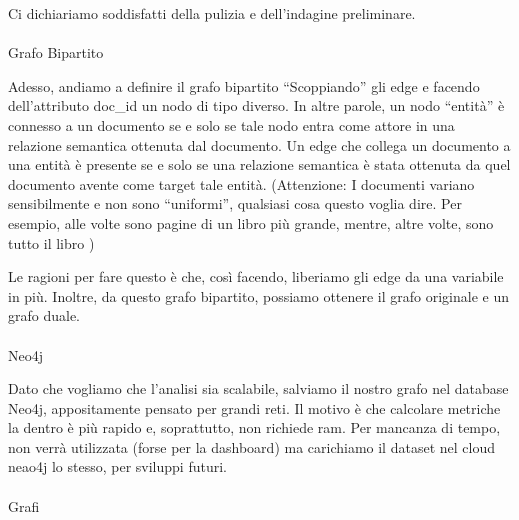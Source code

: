 \documentclass[
  italian,
  a4paper,
]{article}
\makeatletter
\let\oldparagraph\paragraph
\renewcommand{\paragraph}{
    \@ifstar
      \xxxParagraphStar
      \xxxParagraphNoStar
  }
\newcommand{\xxxParagraphStar}[1]{\oldparagraph*{#1}\mbox{}}
\newcommand{\xxxParagraphNoStar}[1]{\oldparagraph{#1}\mbox{}}
\makeatother
\begin{document}
Ci dichiariamo soddisfatti della pulizia e dell'indagine preliminare.

\paragraph{Grafo Bipartito}\label{grafo-bipartito}

Adesso, andiamo a definire il grafo bipartito ``Scoppiando'' gli edge e
facendo dell'attributo doc\_id un nodo di tipo diverso. In altre parole,
un nodo ``entità'' è connesso a un documento se e solo se tale nodo
entra come attore in una relazione semantica ottenuta dal documento. Un
edge che collega un documento a una entità è presente se e solo se una
relazione semantica è stata ottenuta da quel documento avente come
target tale entità. (Attenzione: I documenti variano sensibilmente e non
sono ``uniformi'', qualsiasi cosa questo voglia dire. Per esempio, alle
volte sono pagine di un libro più grande, mentre, altre volte, sono
tutto il libro )

Le ragioni per fare questo è che, così facendo, liberiamo gli edge da
una variabile in più. Inoltre, da questo grafo bipartito, possiamo
ottenere il grafo originale e un grafo duale.

\paragraph{Neo4j}\label{neo4j}

Dato che vogliamo che l'analisi sia scalabile, salviamo il nostro grafo
nel database Neo4j, appositamente pensato per grandi reti. Il motivo è
che calcolare metriche la dentro è più rapido e, soprattutto, non
richiede ram. Per mancanza di tempo, non verrà utilizzata (forse per la
dashboard) ma carichiamo il dataset nel cloud neao4j lo stesso, per
sviluppi futuri.

\paragraph{Grafi}\label{grafi}
\end{document}
